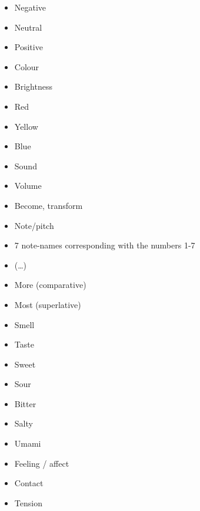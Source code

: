 \begin{itemize}
\item   Negative 

\item   Neutral  

\item   Positive  

\item   Colour 

\item   Brightness 

\item   Red 

\item   Yellow 

\item   Blue 

\item   Sound 

\item   Volume 

\item   Become, transform 

\item   Note/pitch 

\item   7 note-names corresponding with the numbers 1-7 

\item   (…) 

\item   More (comparative)  

\item   Most (superlative) 

\item   Smell 

\item   Taste 

\item   Sweet 

\item   Sour 

\item   Bitter 

\item   Salty 

\item   Umami 

\item   Feeling / affect 

\item   Contact 

\item   Tension 


\end{itemize}

